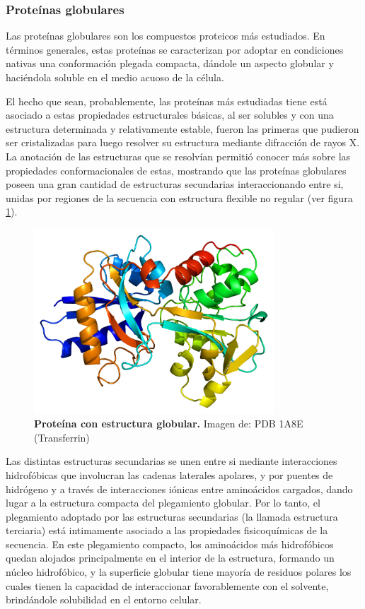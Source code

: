 \subsubsection{Proteínas globulares}

Las proteínas globulares son los compuestos proteicos más estudiados. En términos generales, estas proteínas se caracterizan por adoptar en condiciones nativas una conformación plegada compacta, 
dándole un aspecto globular y haciéndola soluble en el medio acuoso de la célula.


El hecho que sean, probablemente, las proteínas más estudiadas tiene está asociado a estas propiedades estructurales básicas,
al ser solubles y con una estructura determinada y relativamente estable, fueron las primeras que pudieron ser cristalizadas para luego resolver su estructura mediante difracción de rayos X.
La anotación de las estructuras que se resolvían permitió conocer más sobre las propiedades conformacionales de estas, mostrando que las proteínas globulares poseen una gran cantidad de estructuras secundarias interaccionando entre si, 
unidas por regiones de la secuencia con estructura flexible no regular (ver figura \ref{globularExample}).

\begin{figure}[h]
\centering
\includegraphics[width=0.8\textwidth]{img/transferrin.png} 
\caption{\textbf{Proteína con estructura globular.} Imagen de: PDB 1A8E (Transferrin)} 
\label{globularExample}
\end{figure}

Las distintas estructuras secundarias se unen entre si mediante interacciones hidrofóbicas que involucran las cadenas laterales apolares, y por puentes de hidrógeno y a través de interacciones iónicas entre aminoácidos cargados, dando lugar
a la estructura compacta del plegamiento globular. Por lo tanto, el plegamiento adoptado por las estructuras secundarias (la llamada estructura terciaria) está intimamente asociado a las propiedades fisicoquímicas de la secuencia. 
En este plegamiento compacto, los aminoácidos más hidrofóbicos quedan alojados principalmente en el interior de la estructura, formando un núcleo hidrofóbico, 
y la superficie globular tiene mayoría de residuos polares los cuales tienen la capacidad de interaccionar favorablemente con el solvente, brindándole solubilidad en el entorno celular. 


